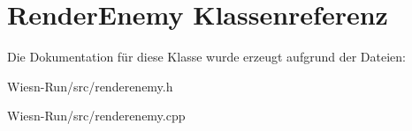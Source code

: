 \hypertarget{classRenderEnemy}{\section{Render\-Enemy Klassenreferenz}
\label{classRenderEnemy}
}


Die Dokumentation für diese Klasse wurde erzeugt aufgrund der Dateien\-:\begin{DoxyCompactItemize}
\item 
Wiesn-\/\-Run/src/renderenemy.\-h\item 
Wiesn-\/\-Run/src/renderenemy.\-cpp\end{DoxyCompactItemize}
